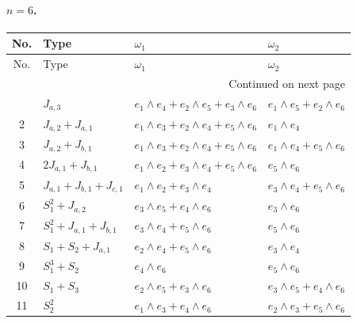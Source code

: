 \paragraph{$n=6$.}
\begin{longtable}{@{}c p{} p{} p{}@{}}
\toprule
No. & Type & $\omega_1$ & $\omega_2$ \\
\midrule
\endfirsthead
\toprule
No. & Type & $\omega_1$ & $\omega_2$ \\
\midrule
\endhead
\midrule
\multicolumn{4}{r}{Continued on next page}\\
\midrule
\endfoot
\bottomrule
\endlastfoot
1 & $J_{a,3}$ & $e_{1} \wedge e_{4} + e_{2} \wedge e_{5} + e_{3} \wedge e_{6}$ & $e_{1} \wedge e_{5} + e_{2} \wedge e_{6}$ \\
2 & $J_{a,2} + J_{a,1}$ & $e_{1} \wedge e_{3} + e_{2} \wedge e_{4} + e_{5} \wedge e_{6}$ & $e_{1} \wedge e_{4}$ \\
3 & $J_{a,2} + J_{b,1}$ & $e_{1} \wedge e_{3} + e_{2} \wedge e_{4} + e_{5} \wedge e_{6}$ & $e_{1} \wedge e_{4} + e_{5} \wedge e_{6}$ \\
4 & $2J_{a,1} + J_{b,1}$ & $e_{1} \wedge e_{2} + e_{3} \wedge e_{4} + e_{5} \wedge e_{6}$ & $e_{5} \wedge e_{6}$ \\
5 & $J_{a,1} + J_{b,1} + J_{c,1}$ & $e_{1} \wedge e_{2} + e_{3} \wedge e_{4}$ & $e_{3} \wedge e_{4} + e_{5} \wedge e_{6}$ \\
6 & $S_{1}^{2} + J_{a,2}$ & $e_{3} \wedge e_{5} + e_{4} \wedge e_{6}$ & $e_{3} \wedge e_{6}$ \\
7 & $S_{1}^{2} + J_{a,1} + J_{b,1}$ & $e_{3} \wedge e_{4} + e_{5} \wedge e_{6}$ & $e_{5} \wedge e_{6}$ \\
8 & $S_{1} + S_{2} + J_{a,1}$ & $e_{2} \wedge e_{4} + e_{5} \wedge e_{6}$ & $e_{3} \wedge e_{4}$ \\
9 & $S_{1}^{3} + S_{2}$ & $e_{4} \wedge e_{6}$ & $e_{5} \wedge e_{6}$ \\
10 & $S_{1} + S_{3}$ & $e_{2} \wedge e_{5} + e_{3} \wedge e_{6}$ & $e_{3} \wedge e_{5} + e_{4} \wedge e_{6}$ \\
11 & $S_{2}^{2}$ & $e_{1} \wedge e_{3} + e_{4} \wedge e_{6}$ & $e_{2} \wedge e_{3} + e_{5} \wedge e_{6}$ \\
\end{longtable}

